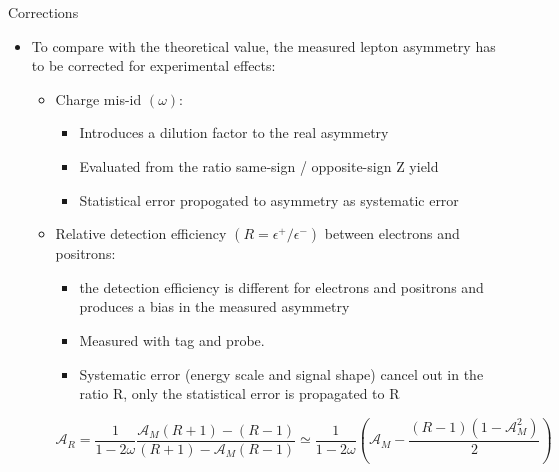 \documentclass[t, 8pt]{beamer}
\begin{document}
\begin{frame}{Corrections}
  \begin{itemize}
    \item To compare with the theoretical value, the measured lepton asymmetry has to be corrected for experimental effects:
    \begin{itemize}
      \item Charge mis-id $(\omega)$: 
      \begin{itemize}
        \item Introduces a dilution factor to the real asymmetry
        \item Evaluated from the ratio same-sign / opposite-sign Z yield
        \item Statistical error propogated to asymmetry as systematic error
      \end{itemize}
      \item Relative detection efficiency $(R = \epsilon^+/\epsilon^-)$ between electrons and positrons: 
      \begin{itemize}
        \item the detection efficiency is different for electrons and positrons and produces a bias in the measured asymmetry
        \item Measured with tag and probe.
        \item Systematic error (energy scale and signal shape) cancel out in the ratio R, only the statistical error is propagated to R
      \end{itemize}
      \begin{equation}
        \mathcal{A}_R=
          \frac{1}{1-2\omega}\frac{ \mathcal{A}_M\left(R+1\right) - \left(R-1\right)}{\left(R+1\right)-\mathcal{A}_M \left(R-1\right)}
          \simeq 
          \frac{1}{1-2\omega}\left(\mathcal{A}_M -\frac{\left(R-1\right)\left(1-\mathcal{A}_M^2\right)}{2}\right)
      \end{equation}
    \end{itemize}
  \end{itemize}
\end{frame}
\end{document}
